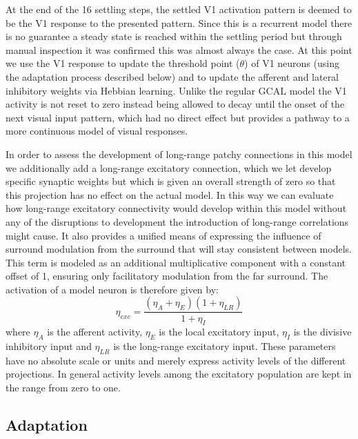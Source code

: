 At the end of the 16 settling steps, the settled V1 activation pattern
is deemed to be the V1 response to the presented pattern. Since this
is a recurrent model there is no guarantee a steady state is reached
within the settling period but through manual inspection it was
confirmed this was almost always the case. At this point we use the V1
response to update the threshold point ($\theta$) of V1 neurons (using
the adaptation process described below) and to update the afferent and
lateral inhibitory weights via Hebbian learning. Unlike the regular
GCAL model the V1 activity is not reset to zero instead being allowed
to decay until the onset of the next visual input pattern, which had
no direct effect but provides a pathway to a more continuous model of
visual responses.

In order to assess the development of long-range patchy connections in
this model we additionally add a long-range excitatory connection,
which we let develop specific synaptic weights but which is given an
overall strength of zero so that this projection has no effect on the
actual model. In this way we can evaluate how long-range excitatory
connectivity would develop within this model without any of the
disruptions to development the introduction of long-range correlations
might cause. It also provides a unified means of expressing the
influence of surround modulation from the surround that will stay
consistent between models. This term is modeled as an additional
multiplicative component with a constant offset of 1, ensuring only
facilitatory modulation from the far surround. The activation of a
model neuron is therefore given by:
\begin{equation}
  \eta_{exc} = \frac{(\eta_{A} + \eta_{E})(1+\eta_{LR})}{1 + \eta_{I}}
\end{equation}
where $\eta_A$ is the afferent activity, $\eta_E$ is the local
excitatory input, $\eta_I$ is the divisive inhibitory input and
$\eta_{LR}$ is the long-range excitatory input. These parameters have
no absolute scale or units and merely express activity levels of the
different projections. In general activity levels among the excitatory
population are kept in the range from zero to one.

\subsection*{Adaptation}

